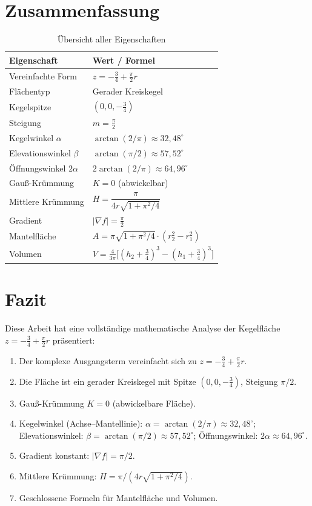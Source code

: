 \documentclass[12pt,a4paper]{article}
\theoremstyle{plain}
\theoremstyle{definition}
\theoremstyle{remark}
\begin{document}
\section{Zusammenfassung}

\begin{table}[H]
\centering
\caption{\"{U}bersicht aller Eigenschaften}
\label{tab:zusammenfassung}
\begin{tabular}{ll}
\toprule
Eigenschaft & Wert / Formel \\
\midrule
Vereinfachte Form & $z = -\tfrac{3}{4}+\tfrac{\pi}{2}r$ \\
Fl\"{a}chentyp & Gerader Kreiskegel \\
Kegelspitze & $(0,0,-\tfrac{3}{4})$ \\
Steigung & $m = \tfrac{\pi}{2}$ \\
Kegelwinkel $\alpha$ & $\arctan(2/\pi)\approx 32{,}48^\circ$ \\
Elevationswinkel $\beta$ & $\arctan(\pi/2)\approx 57{,}52^\circ$ \\
\"{O}ffnungswinkel $2\alpha$ & $2\arctan(2/\pi)\approx 64{,}96^\circ$ \\
Gau\ss-Kr\"{u}mmung & $K=0$ (abwickelbar) \\
Mittlere Kr\"{u}mmung & $H = \dfrac{\pi}{4r\sqrt{1+\pi^2/4}}$ \\[4pt]
Gradient & $|\nabla f| = \tfrac{\pi}{2}$ \\
Mantelfl\"{a}che & $A = \pi\sqrt{1+\pi^2/4}\cdot(r_2^2-r_1^2)$ \\
Volumen & $V = \tfrac{4}{3\pi}\bigl[(h_2+\tfrac{3}{4})^3-(h_1+\tfrac{3}{4})^3\bigr]$ \\
\bottomrule
\end{tabular}
\end{table}

\section{Fazit}

Diese Arbeit hat eine vollst\"{a}ndige mathematische Analyse der Kegelfl\"{a}che
$z = -\tfrac{3}{4}+\tfrac{\pi}{2}r$ pr\"{a}sentiert:

\begin{enumerate}
\item Der komplexe Ausgangsterm vereinfacht sich zu $z = -\tfrac{3}{4}+\tfrac{\pi}{2}r$.
\item Die Fl\"{a}che ist ein gerader Kreiskegel mit Spitze $(0,0,-\tfrac{3}{4})$, Steigung $\pi/2$.
\item Gau\ss-Kr\"{u}mmung $K=0$ (abwickelbare Fl\"{a}che).
\item Kegelwinkel (Achse--Mantellinie): $\alpha = \arctan(2/\pi)\approx 32{,}48^\circ$;
Elevationswinkel: $\beta = \arctan(\pi/2)\approx 57{,}52^\circ$; \"{O}ffnungswinkel: $2\alpha\approx 64{,}96^\circ$.
\item Gradient konstant: $|\nabla f| = \pi/2$.
\item Mittlere Kr\"{u}mmung: $H = \pi/(4r\sqrt{1+\pi^2/4})$.
\item Geschlossene Formeln f\"{u}r Mantelfl\"{a}che und Volumen.
\end{enumerate}
\end{document}
